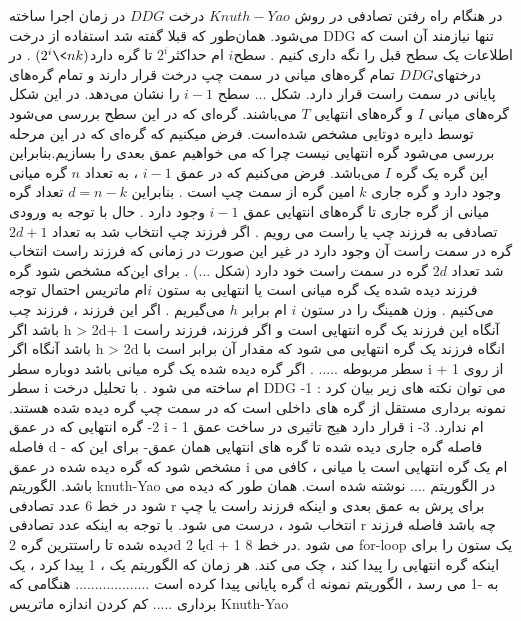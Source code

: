 در هنگام راه رفتن تصادفی در روش $Knuth-Yao$ درخت $DDG $ در زمان اجرا ساخته می‌شود. همان‌طور که قبلا گفته شد استفاده از درخت DDG  تنها نیازمند آن است که اطلاعات یک سطح قبل را نگه داری کنیم . سطح$ i$ ام حداکثر$2^{i}$ تا گره دارد$(2^{i} \< nk)$  . در درختهای$ DDG$ تمام گره‌های میانی در سمت چپ درخت قرار دارند و تمام گره‌های پایانی در سمت راست قرار دارد.  شکل ... سطح $ i - 1$  را نشان می‌دهد. در این شکل گره‌های میانی $I$  و گره‌های انتهایی $T$  می‌باشند. گره‌ای که در این سطح بررسی می‌شود توسط دایره دوتایی مشخص شده‌است. فرض میکنیم که گره‌ای که در این مرحله  بررسی می‌شود گره انتهایی نیست چرا که می خواهیم عمق بعدی را بسازیم.بنابراین این گره یک گره $I$ می‌باشد. فرض می‌کنیم که در عمق $i - 1$  ،  به تعداد $n $ گره میانی وجود دارد و گره جاری $k$  امین گره از سمت چپ است . بنابراین $d= n - k$ تعداد گره میانی از گره جاری تا گره‌های انتهایی عمق $i - 1$ وجود دارد . حال با توجه به ورودی تصادفی به فرزند چپ یا راست می رویم . اگر فرزند چپ انتخاب شد به تعداد $2d + 1$ گره در سمت راست آن وجود دارد در غیر این صورت در زمانی که فرزند راست انتخاب شد تعداد $2d$  گره در سمت راست خود دارد (شکل ...) . برای این‌که مشخص شود گره فرزند دیده شده یک گره میانی است یا انتهایی به ستون $i $ام ماتریس احتمال توجه می‌کنیم . وزن همینگ را در ستون $i$  ام برابر $h$  می‌گیریم . اگر این فرزند ، فرزند چب باشد اگر h > 2d+ 1 آنگاه این فرزند یک گره انتهایی است و اگر   فرزند، فرزند راست باشد آنگاه اگر h > 2d  انگاه فرزند یک گره انتهایی می شود که مقدار آن برابر است با  سطر مربوطه ..... . اگر گره دیده شده یک گره میانی باشد دوباره سطر i + 1  از روی سطر i  ام  ساخته می شود . 
با تحلیل درخت DDG  می توان نکته های زیر بیان کرد :
1- نمونه برداری مستقل از گره های داخلی است  که در سمت چپ گره دیده شده هستند. 
2- گره انتهایی که در عمق i - 1  قرار دارد هیج تاثیری در ساخت عمق i  ام ندارد. 
3- فاصله d - فاصله گره جاری دیده شده تا گره های انتهایی همان عمق-   برای این که مشخص شود که گره دیده شده در عمق i  ام  یک گره انتهایی است یا میانی ، کافی می باشد. 
الگوریتم knuth-Yao  در الگوریتم .... نوشته شده است. همان طور که دیده می شود در خط 6  عدد تصادفی r برای پرش به عمق  بعدی و اینکه فرزند راست یا چپ انتخاب شود ، درست می شود. با توجه به اینکه عدد تصادفی r  چه باشد فاصله فرزند دیده شده تا راستترین گره 2d یا 2d + 1  می شود .در خط 8 for-loop  یک ستون را برای اینکه گره انتهایی را پیدا کند ،  چک می کند. هر زمان که الگوریتم یک ، 1 پیدا کرد ، یک گره پایانی پیدا کرده است   ................... هنگامی که d  به -1 می رسد ، الگوریتم نمونه برداری .....
کم کردن اندازه ماتریس Knuth-Yao
  
  
  

